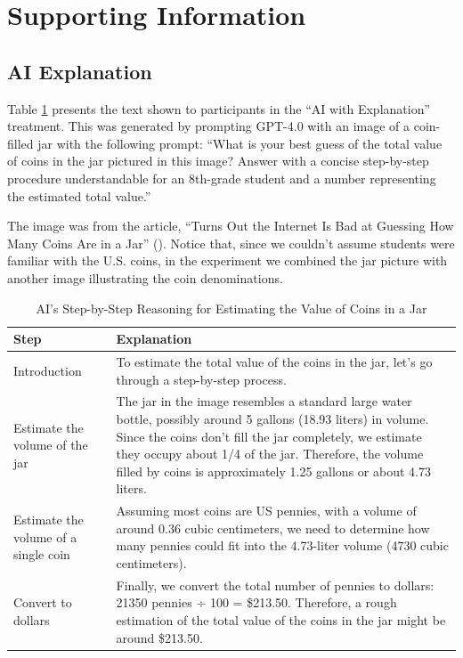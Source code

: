 \documentclass[
  12pt,
]{article}
\begin{document}
\section{Supporting Information}\label{supporting-information}

\subsection{AI Explanation}\label{sec:si-ai-explanation}

Table \ref{tab:explanation} presents the text shown to participants in the ``AI with Explanation'' treatment. This was generated by prompting GPT-4.0 with an image of a coin-filled jar with the following prompt: ``What is your best guess of the total value of coins in the jar pictured in this image? Answer with a concise step-by-step procedure understandable for an 8th-grade student and a number representing the estimated total value.''

The image was from the article, ``Turns Out the Internet Is Bad at Guessing How Many Coins Are in a Jar'' (). Notice that, since we couldn't assume students were familiar with the U.S. coins, in the experiment we combined the jar picture with another image illustrating the coin denominations.

\begin{table}

\caption{\label{tab:explanation}AI's Step-by-Step Reasoning for Estimating the Value of Coins in a Jar}
\centering
\begin{tabular}[t]{l>{\raggedright\arraybackslash}p{4in}}
\toprule
Step & Explanation\\
\midrule
Introduction & To estimate the total value of the coins in the jar, let's go through a step-by-step process.\\
Estimate the volume of the jar & The jar in the image resembles a standard large water bottle, possibly around 5 gallons (18.93 liters) in volume. Since the coins don't fill the jar completely, we estimate they occupy about 1/4 of the jar. Therefore, the volume filled by coins is approximately 1.25 gallons or about 4.73 liters.\\
Estimate the volume of a single coin & Assuming most coins are US pennies, with a volume of around 0.36 cubic centimeters, we need to determine how many pennies could fit into the 4.73-liter volume (4730 cubic centimeters).\\
Convert to dollars & Finally, we convert the total number of pennies to dollars: 21350 pennies ÷ 100 = \$213.50. Therefore, a rough estimation of the total value of the coins in the jar might be around \$213.50.\\
\bottomrule
\end{tabular}
\end{table}
\newpage
\end{document}
